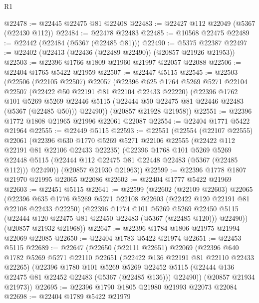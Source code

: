 \begin{lexlean}{R1}
\begin{coremodule}
@22478 := @22445 @22475 @81 @22408
@22483 := @22427 @112 @22049 (@5367 (@22430 @112))
@22484 := @22478 @22483
@22485 := @10568 @22475
@22489 := @22442 (@22484 (@5367 (@22485 @81)))
@22490 := @5375 @22387
@22497 := @22402 (@22413 (@22436 (@22489 @22490)) (@20857 @21926 @21953))
@22503 := @22396 @1766 @1809 @21960 @21997 @22057 @22088
@22506 := @22404 @1765 @5422 @21959
@22507 := @22447 @5115
@22545 := @22503
    (@22506
      (@22105 @22507)
      @22057
      (@22396
        @625
        @1764
        @5269
        @5271
        @22104
        @22507
        (@22422 @50 @22191 @81 @22104 @22433 @22220)
        (@22396
          @1762
          @101
          @5269
          @5269
          @22446
          @5115
          (@22444 @50 @22475 @81 @22446 @22483 (@5367 (@22485 @50)))
          @22490))
      (@20857 @21928 @21958))
@22551 := @22396 @1772 @1808 @21965 @21996 @22061 @22087
@22554 := @22404 @1771 @5422 @21964
@22555 := @22449 @5115
@22593 := @22551
    (@22554
      (@22107 @22555)
      @22061
      (@22396
        @630
        @1770
        @5269
        @5271
        @22106
        @22555
        (@22422 @112 @22191 @81 @22106 @22433 @22235)
        (@22396
          @1768
          @101
          @5269
          @5269
          @22448
          @5115
          (@22444 @112 @22475 @81 @22448 @22483 (@5367 (@22485 @112)))
          @22490))
      (@20857 @21930 @21963))
@22599 := @22396 @1778 @1807 @21970 @21995 @22065 @22086
@22602 := @22404 @1777 @5422 @21969
@22603 := @22451 @5115
@22641 := @22599
    (@22602
      (@22109 @22603)
      @22065
      (@22396
        @635
        @1776
        @5269
        @5271
        @22108
        @22603
        (@22422 @120 @22191 @81 @22108 @22433 @22250)
        (@22396
          @1774
          @101
          @5269
          @5269
          @22450
          @5115
          (@22444 @120 @22475 @81 @22450 @22483 (@5367 (@22485 @120)))
          @22490))
      (@20857 @21932 @21968))
@22647 := @22396 @1784 @1806 @21975 @21994 @22069 @22085
@22650 := @22404 @1783 @5422 @21974
@22651 := @22453 @5115
@22689 := @22647
    (@22650
      (@22111 @22651)
      @22069
      (@22396
        @640
        @1782
        @5269
        @5271
        @22110
        @22651
        (@22422 @136 @22191 @81 @22110 @22433 @22265)
        (@22396
          @1780
          @101
          @5269
          @5269
          @22452
          @5115
          (@22444 @136 @22475 @81 @22452 @22483 (@5367 (@22485 @136)))
          @22490))
      (@20857 @21934 @21973))
@22695 := @22396 @1790 @1805 @21980 @21993 @22073 @22084
@22698 := @22404 @1789 @5422 @21979

\end{coremodule}
\end{lexlean}
